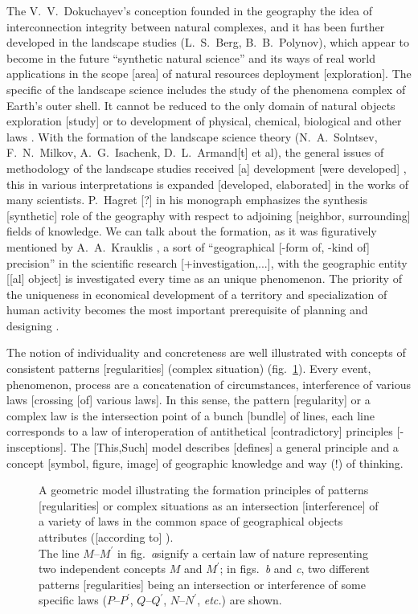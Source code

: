 \documentclass[12pt,leqno]{book}
\numberwithin{equation}{chapter}
\begin{document}
The V.~V.~Dokuchayev's conception founded in the geography the idea of interconnection integrity between natural complexes, and it has been further developed in the landscape studies (L.~S.~Berg, B.~B.~Polynov), which appear to become in the future ``synthetic natural science'' and its ways of real world applications in the scope [area] of natural resources deployment [exploration]. The specific of the landscape science includes the study of the phenomena complex of Earth's outer shell. It cannot be reduced to the only domain of natural objects exploration [study] or to development of physical, chemical, biological and other laws \cite{b285}. With the formation of the landscape science theory (N.~A.~Solntsev, F.~N.~Milkov, A.~G.~Isachenk, D.~L.~Armand[t] et al), the general issues of methodology of the landscape studies received [a] development [were developed] \cite{b288}, this in various interpretations is expanded [developed, elaborated] in the works of many scientists. P.~Hagret [?] in his monograph \cite{b450}  emphasizes the synthesis [synthetic] role of the geography with respect to adjoining [neighbor, surrounding] fields of knowledge. We can talk about the formation, as it was figuratively mentioned by A.~A.~Krauklis \cite[p.~206]{b227}, a sort of ``geographical [-form of, -kind of] precision'' in the scientific research [+investigation,...], with the geographic entity [[al] object] is investigated every time as an unique phenomenon. The priority of the uniqueness in economical development of a territory and specialization of human activity becomes the most important prerequisite of planning and designing \cite{b351}.

The notion of individuality and concreteness are well illustrated with concepts of consistent patterns [regularities] (complex situation) (fig.~\ref{fig:1}). Every event, phenomenon, process are a concatenation of circumstances, interference of various laws [crossing [of] various laws]. In this sense, the pattern [regularity] or a complex law is the intersection point of a bunch [bundle] of lines, each line corresponds to a law of interoperation of antithetical [contradictory] principles [-insceptions]. The [This,Such] model describes [defines] a general principle and a concept [symbol, figure, image] of geographic knowledge and way (!) of thinking.

\begin{figure}[tbhp] \label{fig:1}
\vspace{1em}
\caption{A geometric model illustrating the formation principles of patterns [regularities] or complex situations as an intersection [interference] of a variety of laws in the common space of geographical objects attributes ([according to] \cite{b24}). \protect\\\small{} The line $M\mbox{--}M^\prime{}$ in fig.~\emph{a}signify a certain law of nature representing two independent concepts $M$ and $M^\prime{}$; in figs.~\emph{b} and \emph{c}, two different patterns [regularities] being an intersection or interference of some specific laws ($P\mbox{--}P^\prime{}$, $Q\mbox{--}Q^\prime{}$, $N\mbox{--}N^\prime{}$, \emph{etc.}) are shown.  }
\end{figure}
\end{document}
